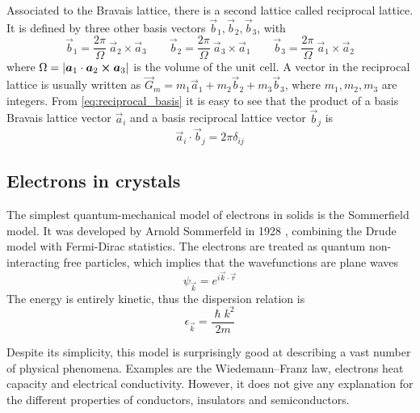 Associated to the Bravais lattice, there is a second lattice called reciprocal lattice. It is defined by three other basis vectors $\vec{b}_1, \vec{b}_2, \vec{b}_3$, with
\begin{equation} \label{eq:reciprocal_basis}
    \vec{b}_1 = \frac{2\pi}{\Omega} \ \vec{a}_2 \times \vec{a}_3
    \qquad
    \vec{b}_2 = \frac{2\pi}{\Omega} \ \vec{a}_3 \times \vec{a}_1
    \qquad
    \vec{b}_3 = \frac{2\pi}{\Omega} \ \vec{a}_1 \times \vec{a}_2
\end{equation}
where $\Omega = \left| \mathbf{\boldsymbol{a}}_1 \cdot \mathbf{\boldsymbol{a}}_2 \cross \mathbf{\boldsymbol{a}}_3 \right|$ is the volume of the unit cell. A vector in the reciprocal lattice is usually written as $\vec{G}_m = m_1\vec{a}_1 + m_2\vec{b}_2 + m_3\vec{b}_3$, where $m_1, m_2, m_3$ are integers. From \cref{eq:reciprocal_basis} it is easy to see that the product of a basis Bravais lattice vector $\vec{a}_i$ and a basis reciprocal lattice vector $\vec{b}_j$ is
\begin{equation}
    \vec{a}_i \cdot \vec{b}_j = 2\pi \delta_{ij}
\end{equation}

\subsection{Electrons in crystals} \label{sec:electrons}
The simplest quantum-mechanical model of electrons in solids is the Sommerfield model. It was developed by Arnold Sommerfeld in 1928 \cite{sommerfeldZurElektronentheorieMetalle1928}, combining the Drude model \cite{drude1900a} with Fermi-Dirac statistics. The electrons are treated as quantum non-interacting free particles, which implies that the wavefunctions are plane waves
\begin{equation} \label{eq:plane_wave}
    \psi_\vec{k} = e^{i\vec{k}\cdot\vec{r}}
\end{equation}
The energy is entirely kinetic, thus the dispersion relation is
\begin{equation} \label{eq:free_dispersion}
    \epsilon_\vec{k} = \frac{\hslash k^2}{2m}
\end{equation}

Despite its simplicity, this model is surprisingly good at describing a vast number of physical phenomena. Examples are the Wiedemann–Franz law, electrons heat capacity and electrical conductivity. However, it does not give any explanation for the different properties of conductors, insulators and semiconductors.

